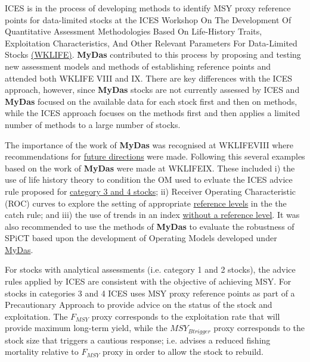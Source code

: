 ICES is in the process of developing methods to identify MSY proxy reference points for data-limited stocks at the ICES Workshop On The Development Of Quantitative Assessment Methodologies Based On Life-History Traits, Exploitation Characteristics, And Other Relevant Parameters For Data-Limited Stocks \href{http://ices.dk/sites/pub/Publication Reports/Expert Group Report/Fisheries Resources Steering Group/2019/WKLIFEIX/WKLIFE_IX_2019.pdf}{(WKLIFE)}. \textbf{MyDas} contributed to this process by proposing and testing new assessment models and methods of establishing reference points and attended both WKLIFE VIII and IX. There are key differences with the ICES approach, however, since \textbf{MyDas} stocks are not currently assessed by ICES and \textbf{MyDas} focused on the available data for each stock first and then on methods, while the ICES approach focuses on the methods first and then applies a limited number of methods to a large number of stocks. 

The importance of the work of \textbf{MyDas} was recognised at WKLIFEVIII where recommendations for \href{http://ices.dk/sites/pub/Publication Reports/Expert Group Report/acom/2018/WKLIFEVIII/WKLIFEVIII_2018.pdf#page=42}{future directions} were made. Following this several examples based on the work of \textbf{MyDas} were made at WKLIFEIX. These included i) the use of life history theory to condition the OM used to evluate the ICES advice rule proposed for \href{http://ices.dk/sites/pub/Publication Reports/Expert Group Report/Fisheries Resources Steering Group/2019/WKLIFEIX/WKLIFE_IX_2019.pdf#page=30}{category 3 and 4 stocks}; ii) Receiver Operating Characteristic (ROC) curves to explore the setting of appropriate 
\href{http://ices.dk/sites/pub/Publication Reports/Expert Group Report/Fisheries Resources Steering Group/2019/WKLIFEIX/WKLIFE_IX_2019.pdf#page=58}{reference levels} in the the catch rule; and iii) the use of trends in an index \href{http://ices.dk/sites/pub/Publication Reports/Expert Group Report/Fisheries Resources Steering Group/2019/WKLIFEIX/WKLIFE_IX_2019.pdf#page=64}{without a reference level}. It was also recommended to use the methods of \textbf{MyDas} to evaluate the robustness of SPiCT based upon the development of Operating Models developed under \href{http://ices.dk/sites/pub/Publication Reports/Expert Group Report/Fisheries Resources Steering Group/2019/WKLIFEIX/WKLIFE_IX_2019.pdf#page=138}{MyDas}.

For stocks with analytical assessments (i.e. category 1 and 2 stocks), the advice rules applied by ICES are consistent with the objective of achieving MSY. For stocks in categories 3 and 4 ICES uses MSY proxy reference points as part of a Precautionary Approach to provide advice on the status of the stock and exploitation. The $F_{MSY}$ proxy corresponds to the exploitation rate that will provide maximum long-term yield, while the $MSY_{Btrigger}$ proxy corresponds to the stock size that triggers a cautious response; i.e. advises a reduced fishing mortality relative to $F_{MSY}$ proxy in order to allow the stock to rebuild. 

